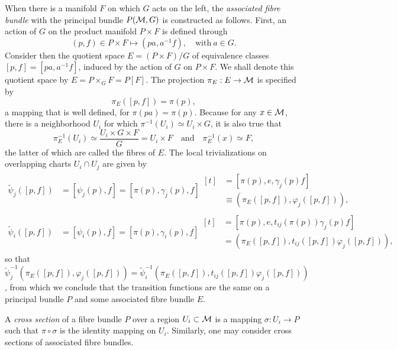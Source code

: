 \documentclass[
final,
11pt,
a4paper,
DIV=11,
headinclude=true,
footinclude=false,
bibliography=totoc,
twoside=true,  %
BCOR=5mm
]{scrbook}
\begin{document}
When there is a manifold $F$ on which $G$ acts on the left, the 
\emph{associated fibre bundle} with the principal bundle 
$P(\mathcal{M},G)$ is constructed as follows. First, an action of $G$ 
on the product manifold $P \times F$ is defined through
\begin{equation*}
  (p,f) \in P \times F \mapsto (pa,a^{-1}f),
  \quad\text{with}~a \in G.
\end{equation*}
Consider then the quotient space $E = (P \times F)/G$ of 
equivalence classes $[p,f] = [pa,a^{-1}f]$, induced by the action 
of $G$ on $P \times F$.  We shall denote this quotient space by 
$E = P \times_G F = P[F]$. The projection $\pi_E : E \to \mathcal{M}$ 
is specified by
\begin{equation*}
  \pi_E([p,f]) = \pi(p),
\end{equation*}
a mapping that is well defined, for $\pi(pa) = \pi(p)$. Because 
for any $x \in \mathcal{M}$, there is a neighborhood $U_i$ for which 
$\pi^{-1}(U_i) \simeq U_i \times G$, it is also true that
\begin{equation*}
  \pi_E^{-1}(U_i) \simeq \frac{U_i \times G \times F}{G} = U_i 
  \times F
  \quad\text{and}\quad
  \pi_E^{-1}(x) \simeq F,
\end{equation*}
the latter of which are called the fibres of $E$. The local 
trivializations on overlapping charts $U_i \cap U_j$ are given by
\begin{align*}
  \tilde{\psi}_j([p,f])
  &= [\psi_j(p),f] = [\pi(p),\gamma_j(p),f]
  \begin{aligned}[t]
    &= [\pi(p),e,\gamma_j(p)f]
    \\
    &\equiv (\pi_E([p,f]),\varphi_j([p,f])),
  \end{aligned}
  \\
  \tilde{\psi}_i([p,f])
  &= [\psi_i(p),f] = [\pi(p),\gamma_i(p),f]
  \begin{aligned}[t]
    &= [\pi(p),e,t_{ij}(\pi(p))\gamma_j(p)f]
    \\
    &= (\pi_E([p,f]),t_{ij}([p,f])\varphi_j([p,f])),
  \end{aligned}
\end{align*}
so that $\tilde{\psi}_j^{-1}(\pi_E([p,f]),\varphi_j([p,f])) = 
\tilde{\psi}_i^{-1}(\pi_E([p,f]),t_{ij}([p,f])\varphi_j([p,f]))$, 
from which we conclude that the transition functions are the same 
on a principal bundle $P$ and some associated fibre bundle $E$.

A \emph{cross section} of a fibre bundle $P$ over a region $U_i 
\subset \mathcal{M}$ is a mapping $\sigma : U_i \to P$ such that $\pi 
\circ \sigma$ is the identity mapping on $U_i$. Similarly, one 
may consider cross sections of associated fibre bundles.
\end{document}
